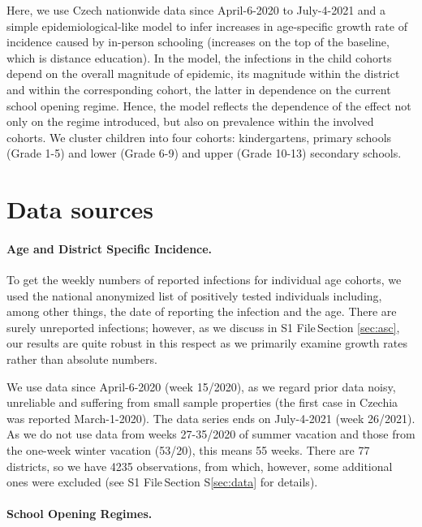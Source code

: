 \documentclass[fleqn,10pt]{wlscirep}
\def\supfile{S1 File\,}
\begin{document}
Here, we use Czech nationwide data since April-6-2020 to July-4-2021 and a simple epidemiological-like model to infer increases in age-specific growth rate of incidence caused by in-person schooling (increases on the top of the baseline, which is distance education). In the model, the infections in the child cohorts depend on the overall magnitude of epidemic, its magnitude within the district and within the corresponding cohort, the latter in dependence on the current school opening regime. Hence, the model reflects the dependence of the effect not only on the regime introduced, but also on prevalence within the involved cohorts. We cluster children into four cohorts: kindergartens, primary schools (Grade 1-5) and lower (Grade 6-9) and upper (Grade 10-13) secondary schools.



\section*{Data sources}

\paragraph*{Age and District Specific Incidence.}

To get the weekly numbers of reported infections for individual age cohorts, we used the national anonymized list of positively tested individuals \cite{osoby} including, among other things, the date of reporting the infection and the age. There are surely unreported infections; however, as we discuss in \supfile Section  \ref{sec:asc}, our results are quite robust in this respect as we primarily examine growth rates rather than absolute numbers.   

We use data since April-6-2020 (week 15/2020), as we regard prior data noisy, unreliable and suffering from small sample properties (the first case in Czechia was reported March-1-2020). The data series ends on July-4-2021 (week 26/2021). As we do not use data from weeks 27-35/2020 of summer vacation and those from the one-week winter vacation (53/20), this means 55 weeks. There are 77 districts, so we have 4235 observations, from which, however, some additional ones were excluded (see \supfile Section S\ref{sec:data} for details).

\paragraph*{School Opening Regimes.}
\end{document}
